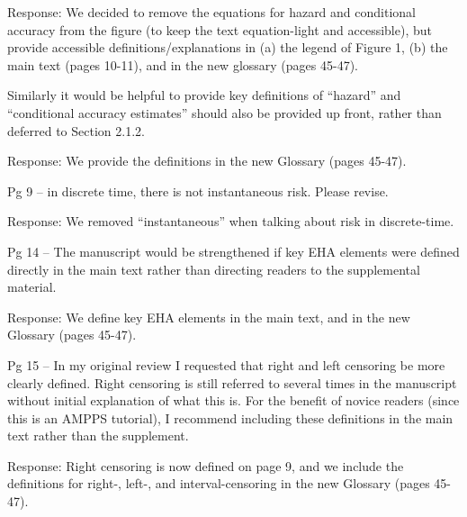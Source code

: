 \documentclass[
]{article}
\renewenvironment{quote}{\begin{leftbar}}{\end{leftbar}}
\begin{document}
Response: We decided to remove the equations for hazard and conditional
accuracy from the figure (to keep the text equation-light and
accessible), but provide accessible definitions/explanations in (a) the
legend of Figure 1, (b) the main text (pages 10-11), and in the new
glossary (pages 45-47).

\begin{quote}
Similarly it would be helpful to provide key definitions of ``hazard''
and ``conditional accuracy estimates'' should also be provided up front,
rather than deferred to Section 2.1.2.
\end{quote}

Response: We provide the definitions in the new Glossary (pages 45-47).

\begin{quote}
Pg 9 -- in discrete time, there is not instantaneous risk. Please
revise.
\end{quote}

Response: We removed ``instantaneous'' when talking about risk in
discrete-time.

\begin{quote}
Pg 14 -- The manuscript would be strengthened if key EHA elements were
defined directly in the main text rather than directing readers to the
supplemental material.
\end{quote}

Response: We define key EHA elements in the main text, and in the new
Glossary (pages 45-47).

\begin{quote}
Pg 15 -- In my original review I requested that right and left censoring
be more clearly defined. Right censoring is still referred to several
times in the manuscript without initial explanation of what this is. For
the benefit of novice readers (since this is an AMPPS tutorial), I
recommend including these definitions in the main text rather than the
supplement.
\end{quote}

Response: Right censoring is now defined on page 9, and we include the
definitions for right-, left-, and interval-censoring in the new
Glossary (pages 45-47).
\end{document}
